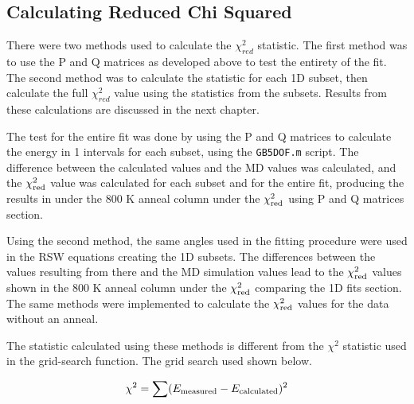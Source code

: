 \documentclass[12pt]{report}
\begin{document}
\subsection{Calculating Reduced Chi Squared}
There were two methods used to calculate the $\chi^2_{red}$ statistic.  The first method was to use the P and Q matrices as developed above to test the entirety of the fit.  The second method was to calculate the statistic for each 1D subset, then calculate the full $\chi^2_{red}$ value using the statistics from the subsets.  Results from these calculations are discussed in the next chapter.

The test for the entire fit was done by using the P and Q matrices to calculate the energy in 1\textdegree{} intervals for each subset, using the \verb!GB5DOF.m! script.  The difference between the calculated values and the MD values was calculated, and the $\chi_{\textnormal{red}}^2$ value was calculated for each subset and for the entire fit, producing the results in  under the 800 K anneal column under the $\chi_{\textnormal{red}}^2$ using P and Q matrices section.

Using the second method, the same angles used in the fitting procedure were used in the RSW equations creating the 1D subsets.  The differences between the values resulting from there and the MD simulation values lead to the $\chi_{\textnormal{red}}^2$ values shown in the 800 K anneal column under the $\chi_{\textnormal{red}}^2$ comparing the 1D fits section.  The same methods were implemented to calculate the $\chi_{\textnormal{red}}^2$ values for the data without an anneal.

The statistic calculated using these methods is different from the $\chi^2$ statistic used in the grid-search function.  The grid search used  shown below.

\begin{equation}
\label{eq:chi2grid}
\chi^2=\sum (E_{\textnormal{measured}} - E_{\textnormal{calculated}})^2
\end{equation}
\newpage

\end{document}

